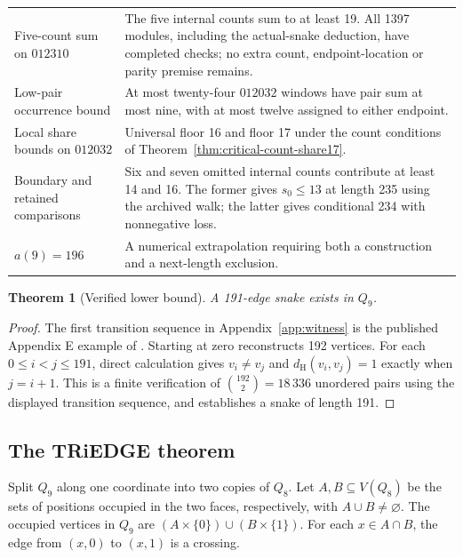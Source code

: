 \documentclass[11pt,a4paper]{article}
\newtheorem{theorem}{Theorem}[section]
\theoremstyle{definition}
\theoremstyle{remark}
\newcommand{\Q}{Q}
\newcommand{\Ham}{d_{\mathrm H}}
\begin{document}
\begin{center}
\begin{tabular}{p{}p{}}
Five-count sum on $012310$ & The five internal counts sum to at least 19. All 1397 modules, including the actual-snake deduction, have completed checks; no extra count, endpoint-location or parity premise remains.\\
Low-pair occurrence bound & At most twenty-four $012032$ windows have pair sum at most nine, with at most twelve assigned to either endpoint.\\
Local share bounds on $012032$ & Universal floor 16 and floor 17 under the count conditions of Theorem~\ref{thm:critical-count-share17}.\\
Boundary and retained comparisons & Six and seven omitted internal counts contribute at least 14 and 16. The former gives $s_0\le13$ at length 235 using the archived walk; the latter gives conditional 234 with nonnegative loss.\\
$a(9)=196$ & A numerical extrapolation requiring both a construction and a next-length exclusion.\\
\bottomrule
\end{tabular}
\end{center}

\begin{theorem}[Verified lower bound]\label{thm:lower}
A 191-edge snake exists in $\Q_9$.
\end{theorem}
\begin{proof}
The first transition sequence in Appendix~\ref{app:witness} is the published Appendix E example of \cite{orland}. Starting at zero reconstructs 192 vertices. For each $0\le i<j\le191$, direct calculation gives $v_i\ne v_j$ and $\Ham(v_i,v_j)=1$ exactly when $j=i+1$. This is a finite verification of $\binom{192}{2}=18\,336$ unordered pairs using the displayed transition sequence, and establishes a snake of length 191.
\end{proof}

\subsection{The TRiEDGE theorem}\label{sec:triedge}
Split $\Q_9$ along one coordinate into two copies of $\Q_8$.
Let $A,B\subseteq V(\Q_8)$ be the sets of positions occupied in the two faces,
respectively, with $A\cup B\ne\varnothing$. The occupied vertices in $\Q_9$ are
$(A\times\{0\})\cup(B\times\{1\})$. For each $x\in A\cap B$, the edge
from $(x,0)$ to $(x,1)$ is a crossing.
\end{document}
